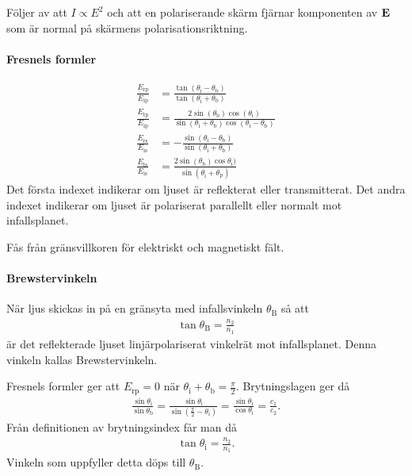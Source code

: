 \deriv
Följer av att $I\propto E^2$ och att en polariserande skärm fjärnar komponenten av $\vb{E}$ som är normal på skärmens polarisationsriktning.

\paragraph{Fresnels formler}
\begin{align*}
	\frac{E_{\text{rp}}}{E_{\text{ip}}} &= \frac{\tan{(\theta_{\text{i}} - \theta_{\text{b}})}}{\tan{(\theta_{\text{i}} + \theta_{\text{b}})}} \\
	\frac{E_{\text{tp}}}{E_{\text{ip}}} &= \frac{2\sin{(\theta_{\text{b}})}\cos{(\theta_{\text{i}})}}{\sin{(\theta_{\text{i}} + \theta_{\text{b}})}\cos{(\theta_{\text{i}} - \theta_{\text{b}})}} \\
	\frac{E_{\text{rs}}}{E_{\text{is}}} &= -\frac{\sin{(\theta_{\text{i}} - \theta_{\text{b}})}}{\sin{(\theta_{\text{i}} + \theta_{\text{b}})}} \\
	\frac{E_{\text{ts}}}{E_{\text{is}}} &= \frac{2\sin{(\theta_{\text{b}})}\cos{\theta_{\text{i}})}}{\sin{(\theta_{\text{i}} + \theta_{\text{p}})}}
\end{align*}
Det första indexet indikerar om ljuset är reflekterat eller transmitterat. Det andra indexet indikerar om ljuset är polariserat parallellt eller normalt mot infallsplanet.

\deriv
Fås från gränsvillkoren för elektriskt och magnetiskt fält.

\paragraph{Brewstervinkeln}
När ljus skickas in på en gränsyta med infallsvinkeln $\theta_{\text{B}}$ så att
\begin{align*}
	\tan{\theta_{\text{B}}} = \frac{n_2}{n_1}
\end{align*}
är det reflekterade ljuset linjärpolariserat vinkelrät mot infallsplanet. Denna vinkeln kallas Brewstervinkeln.

\deriv
Fresnels formler ger att $E_{\text{rp}} = 0$ när $\theta_{\text{i}} + \theta_{\text{b}} = \frac{\pi}{2}$. Brytningslagen ger då
\begin{align*}
	\frac{\sin{\theta_{\text{i}}}}{\sin{\theta_{\text{b}}}} = \frac{\sin{\theta_{\text{i}}}}{\sin{\left(\frac{\pi}{2} - \theta_{\text{i}}\right)}} = \frac{\sin{\theta_{\text{i}}}}{\cos{\theta_{\text{i}}}} = \frac{c_{1}}{c_{2}}.
\end{align*}
Från definitionen av brytningsindex får man då
\begin{align*}
	\tan{\theta_{\text{i}}} = \frac{n_2}{n_1}.
\end{align*}
Vinkeln som uppfyller detta döps till $\theta_{\text{B}}$.
